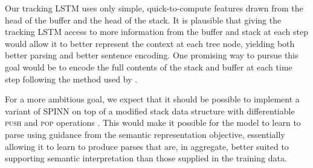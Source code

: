\documentclass[11pt]{article}
\begin{document}
Our tracking LSTM uses only simple, quick-to-compute features drawn from the head of the buffer and the head of the stack. It is plausible that giving the tracking LSTM access to more information from the buffer and stack at each step would allow it to better represent the context at each tree node, yielding both better parsing and better sentence encoding. One promising way to pursue this goal would be to encode the full contents of the stack and buffer at each time step following the method used by \citet{dyer-EtAl:2015:ACL-IJCNLP}.

For a more ambitious goal, we expect that it should be possible to implement a variant of SPINN on top of a modified stack data structure with differentiable \textsc{push} and \textsc{pop} operations \citep[as in][]{grefenstette2015learning,joulin2015inferring}. This would make it possible for the model to learn to parse using guidance from the semantic representation objective, essentially allowing it to learn to produce parses that are, in aggregate, better suited to supporting semantic interpretation than those supplied in the training data.

%



\end{document}
